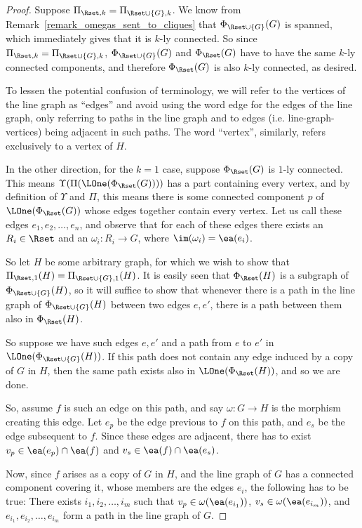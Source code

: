 \documentclass[a4paper,reqno,oneside]{article} %
\begin{document}
\begin{proof}
    Suppose $\Pi_{\Rset,k} = \Pi_{\Rset\cup\{G\},k}$. We know from Remark~\ref{remark_omegas_sent_to_cliques} that $\Phi_{\Rset \cup \{G\}}(G)$ is spanned, which immediately gives that it is $k$-ly connected. So since $\Pi_{\Rset,k} = \Pi_{\Rset\cup\{G\},k}$, $\Phi_{\Rset \cup \{G\}}(G)$ and $\Phi_{\Rset}(G)$ have to have the same $k$-ly connected components, and therefore $\Phi_\Rset(G)$ is also $k$-ly connected, as desired.

    To lessen the potential confusion of terminology, we will refer to the vertices of the line graph as ``edges'' and avoid using the word edge for the edges of the line graph, only referring to paths in the line graph and to edges (i.e. line-graph-vertices) being adjacent in such paths. The word ``vertex'', similarly, refers exclusively to a vertex of $H$.

    In the other direction, for the $k = 1$ case, suppose $\Phi_\Rset(G)$ is $1$-ly connected. This means $\Upsilon(\Pi(\LOne(\Phi_{\Rset}(G))))$ has a part containing every vertex, and by definition of $\Upsilon$ and $\Pi$, this means there is some connected component $p$ of $\LOne(\Phi_{\Rset}(G))$ whose edges together contain every vertex. Let us call these edges $e_1, e_2, \ldots, e_n$, and observe that for each of these edges there exists an $R_i \in \Rset$ and an $\omega_i: R_i \to G$, where $\im(\omega_i) = \ea(e_i)$.

    So let $H$ be some arbitrary graph, for which we wish to show that $\Pi_{\Rset,1}(H) = \Pi_{\Rset\cup\{G\},1}(H)$. It is easily seen that $\Phi_\Rset(H)$ is a subgraph of $\Phi_{\Rset\cup\{G\}}(H)$, so it will suffice to show that whenever there is a path in the line graph of $\Phi_{\Rset\cup\{G\}}(H)$ between two edges $e, e'$, there is a path between them also in $\Phi_{\Rset}(H)$.

    So suppose we have such edges $e, e'$ and a path from $e$ to $e'$ in $\LOne(\Phi_{\Rset\cup\{G\}}(H))$. If this path does not contain any edge induced by a copy of $G$ in $H$, then the same path exists also in $\LOne(\Phi_\Rset(H))$, and so we are done.

    So, assume $f$ is such an edge on this path, and say $\omega: G \to H$ is the morphism creating this edge. Let $e_p$ be the edge previous to $f$ on this path, and $e_s$ be the edge subsequent to $f$. Since these edges are adjacent, there has to exist $v_p \in \ea(e_p)\cap\ea(f)$ and $v_s \in \ea(f)\cap\ea(e_s)$.

    Now, since $f$ arises as a copy of $G$ in $H$, and the line graph of $G$ has a connected component covering it, whose members are the edges $e_i$, the following has to be true: There exists $i_1, i_2, \ldots, i_m$ such that $v_p \in \omega(\ea(e_{i_1}))$, $v_s \in \omega(\ea(e_{i_m}))$, and $e_{i_1}, e_{i_2}, \ldots, e_{i_m}$ form a path in the line graph of $G$.


\end{proof}
\end{document}
